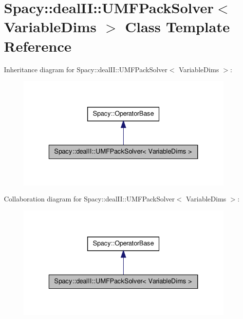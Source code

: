 \hypertarget{classSpacy_1_1dealII_1_1UMFPackSolver}{\section{\-Spacy\-:\-:deal\-I\-I\-:\-:\-U\-M\-F\-Pack\-Solver$<$ \-Variable\-Dims $>$ \-Class \-Template \-Reference}
\label{classSpacy_1_1dealII_1_1UMFPackSolver}
}


\-Inheritance diagram for \-Spacy\-:\-:deal\-I\-I\-:\-:\-U\-M\-F\-Pack\-Solver$<$ \-Variable\-Dims $>$\-:
\nopagebreak
\begin{figure}[H]
\begin{center}
\leavevmode
\includegraphics[width=308pt]{classSpacy_1_1dealII_1_1UMFPackSolver__inherit__graph}
\end{center}
\end{figure}


\-Collaboration diagram for \-Spacy\-:\-:deal\-I\-I\-:\-:\-U\-M\-F\-Pack\-Solver$<$ \-Variable\-Dims $>$\-:
\nopagebreak
\begin{figure}[H]
\begin{center}
\leavevmode
\includegraphics[width=308pt]{classSpacy_1_1dealII_1_1UMFPackSolver__coll__graph}
\end{center}
\end{figure}
